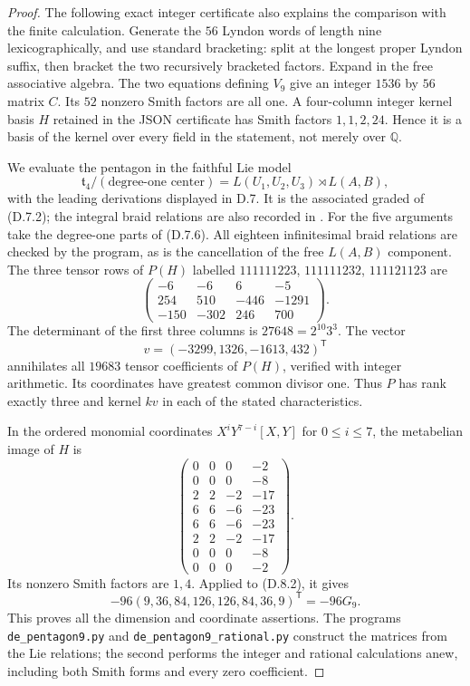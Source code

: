 \begin{proof}
The following exact integer certificate also explains the
comparison with the finite calculation. Generate the $56$
Lyndon words of length nine lexicographically, and use standard
bracketing: split at the longest proper Lyndon suffix, then
bracket the two recursively bracketed factors. Expand in the
free associative algebra. The two equations defining $V_9$
give an integer $1536$ by $56$ matrix $C$. Its $52$ nonzero
Smith factors are all one. A four-column integer kernel basis
$H$ retained in the JSON certificate has Smith factors
$1,1,2,24$. Hence it is a basis of the kernel over every field
in the statement, not merely over $\mathbb Q$.

We evaluate the pentagon in the faithful Lie model
\[
 \mathfrak t_4/(\text{degree-one center})
       =L(U_1,U_2,U_3)\rtimes L(A,B),
\]
with the leading derivations displayed in D.7. It is the
associated graded of (D.7.2); the integral braid relations are
also recorded in \cite[(4.1)]{DE_CohenFalkRandell2012}.
For the five arguments take the degree-one parts of (D.7.6).
All eighteen infinitesimal braid relations are checked by the
program, as is the cancellation of the free $L(A,B)$ component.
The three tensor rows of $P(H)$ labelled
$111111223$, $111111232$, $111121123$ are
\[
 \begin{pmatrix}
 -6&-6&6&-5\\
 254&510&-446&-1291\\
 -150&-302&246&700
 \end{pmatrix}.
 \tag{D.8.1}
\]
The determinant of the first three columns is
$27648=2^{10}3^3$. The vector
\[
                 v=(-3299,1326,-1613,432)^{\mathsf T}
 \tag{D.8.2}
\]
annihilates all $19683$ tensor coefficients of $P(H)$, verified
with integer arithmetic. Its coordinates have greatest common
divisor one. Thus $P$ has rank exactly three and kernel $kv$
in each of the stated characteristics.

In the ordered monomial coordinates
$X^iY^{7-i}[X,Y]$ for $0\le i\le7$, the metabelian image of
$H$ is
\[
 \begin{pmatrix}
 0&0&0&-2\\
 0&0&0&-8\\
 2&2&-2&-17\\
 6&6&-6&-23\\
 6&6&-6&-23\\
 2&2&-2&-17\\
 0&0&0&-8\\
 0&0&0&-2
 \end{pmatrix}.
 \tag{D.8.3}
\]
Its nonzero Smith factors are $1,4$. Applied to (D.8.2), it
gives
\[
 -96(9,36,84,126,126,84,36,9)^{\mathsf T}=-96G_9.
\]
This proves all the dimension and coordinate assertions.
The programs \texttt{de\_pentagon9.py} and
\texttt{de\_pentagon9\_rational.py} construct the matrices
from the Lie relations; the second performs the integer and
rational calculations anew, including both Smith forms and
every zero coefficient.


\end{proof}

